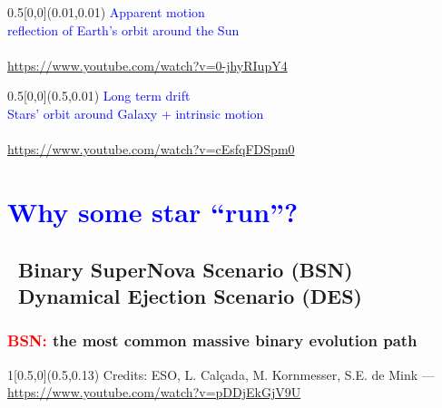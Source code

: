 \documentclass[xcolor=dvipsnames,professionalfonts, aspectratio=169]{beamer}
\begin{document}
\begin{frame}[c,plain]
  \begin{textblock}{0.5}[0,0](0.01,0.01)
    \centering
    \textcolor{Blue}{{\large Apparent motion}\\
      {\small reflection of Earth's orbit around the Sun}}\\[70pt]
    \vfill
      \\
      \textcolor{gray!50}{\tiny \url{https://www.youtube.com/watch?v=0-jhyRIupY4}}
    \end{textblock}
    \begin{textblock}{0.5}[0,0](0.5,0.01)
      \centering
      \textcolor{Blue}{{\large Long term drift}\\
        {\small Stars' orbit around Galaxy + intrinsic motion}}\\[68pt]
      \vfill
      \\
      \textcolor{gray!50}{\tiny \url{https://www.youtube.com/watch?v=cEsfqFDSpm0}}
  \end{textblock}
\end{frame}



\section{\textcolor{Blue}{Why some star ``run''?}}
\subsection{\textcolor{Blue}{\textbullet}~Binary SuperNova Scenario
  (BSN) \\\textcolor{Blue}{\textbullet}~Dynamical Ejection Scenario (DES)}


\begin{frame}
  \frametitle{\textcolor{red}{BSN:} the most common massive binary evolution path}
  \centering
  \vspace*{8pt}


  \begin{textblock}{1}[0.5,0](0.5,0.13)
    \textcolor{gray!50}{\tiny Credits: ESO, L. Calçada, M. Kornmesser,
      S.E. de Mink  --- \url{https://www.youtube.com/watch?v=pDDjEkGjV9U}}
  \end{textblock}
\end{frame}
\end{document}
